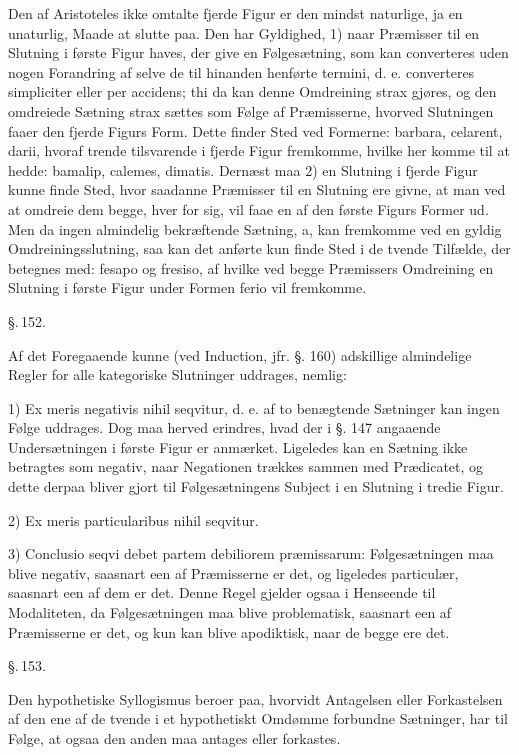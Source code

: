 \documentclass[12pt]{book}
\def\textit#1{#1}%
\def\emph#1{#1}%
\newcommand{\parag}[1]{%
  \par\vspace{0.9\baselineskip}%
  {\centering\textit{\S.\,#1.}\par}%
  \vspace{0.35\baselineskip}%
  \noindent\hspace{\parindent}\ignorespaces
}
\newcommand{\opage}[1]{\marginnote{\footnotesize\textit{[#1]}}}
\begin{document}
Den af Aristoteles ikke omtalte fjerde Figur er den mindst naturlige, ja en
unaturlig, Maade at slutte paa. Den har Gyldighed, 1) naar Præmisser til en
Slutning i første Figur haves, der give en Følgesætning, som kan converteres
uden nogen Forandring af selve de til hinanden henførte \textit{termini}, d. e.
converteres \textit{simpliciter} eller \textit{per accidens}; thi da kan denne
Omdreining strax gjøres, og den omdreiede Sætning strax sættes som Følge af
Præmisserne, hvorved Slutningen faaer den fjerde Figurs Form. Dette finder Sted
ved Formerne: \textit{barbara}, \textit{celarent}, \textit{darii}, hvoraf trende
tilsvarende i fjerde Figur fremkomme, hvilke her komme til at hedde:
\textit{bamalip}, \textit{calemes}, \textit{dimatis}. Dernæst maa 2) en Slutning
i fjerde Figur kunne finde Sted, hvor saadanne Præmisser til en Slutning ere
givne, at man ved at omdreie dem begge, hver for sig, vil faae en af den første
Figurs Former ud. Men da ingen almindelig bekræftende Sætning, \textit{a}, kan
fremkomme ved en gyldig Omdreiningsslutning, saa kan det anførte kun finde Sted
i de tvende Tilfælde, der betegnes med: \textit{fesapo} og \textit{fresiso}, af
hvilke ved begge Præmissers Omdreining en Slutning i første Figur under Formen
\textit{ferio} vil fremkomme.

\parag{152}

Af det Foregaaende kunne (ved Induction, jfr. §. 160) adskillige almindelige
Regler for alle kategoriske Slutninger uddrages, nemlig:

\opage{345} 1) \textit{Ex meris negativis nihil seqvitur}, d. e. af to benægtende Sætninger
kan ingen Følge uddrages. Dog maa herved erindres, hvad der i §. 147 angaaende
Undersætningen i første Figur er anmærket. Ligeledes kan en Sætning ikke
betragtes som negativ, naar Negationen trækkes sammen med Prædicatet, og dette
derpaa bliver gjort til Følgesætningens Subject i en Slutning i tredie Figur.

2) \textit{Ex meris particularibus nihil seqvitur}.

3) \textit{Conclusio seqvi debet partem debiliorem præmissarum}:
Følgesætningen maa blive negativ, saasnart een af Præmisserne er det, og
ligeledes particulær, saasnart een af dem er det. Denne Regel gjelder ogsaa i
Henseende til \emph{Modaliteten}, da Følgesætningen maa blive problematisk,
saasnart een af Præmisserne er det, og kun kan blive apodiktisk, naar de begge
ere det.

\parag{153}

Den hypothetiske Syllogismus beroer paa, hvorvidt Antagelsen eller
Forkastelsen af den ene af de tvende i et hypothetiskt Omdømme forbundne
Sætninger, har til Følge, at ogsaa den anden maa antages eller forkastes.
\end{document}
